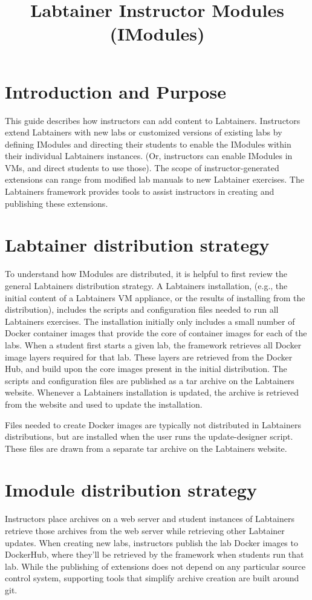 \documentclass[12pt]{article}
\begin{document}
\title {Labtainer Instructor Modules (IModules)}
\maketitle

\section{Introduction and Purpose}
This guide describes how instructors can add content to Labtainers.
Instructors extend Labtainers with new labs or customized versions of existing
labs by defining IModules and directing their students to enable the IModules within
their individual Labtainers instances. 
(Or, instructors can enable IModules in VMs, and direct students to use those).
The scope of instructor-generated extensions can range from modified lab manuals 
to new Labtainer exercises.  The Labtainers framework provides tools
to assist instructors in creating and publishing these extensions. 

\section{Labtainer distribution strategy}
To understand how IModules are distributed, it is helpful to first review the general
Labtainers distribution strategy.  A Labtainers installation, (e.g., the initial content of a Labtainers VM 
appliance, or the results of installing from the distribution),  includes the scripts and configuration files 
needed to run all Labtainers exercises.  The installation initially only includes a small number of 
Docker container images that provide the core of container images for each of the labs.   
When a student first starts a given lab, the framework retrieves all Docker image layers 
required for that lab.  These layers are retrieved from the Docker Hub, and build upon the core images
present in the initial distribution.   The scripts and configuration files are 
published as a tar archive on the Labtainers website.  Whenever a Labtainers installation is updated, 
the archive is retrieved from the website and used to update the installation.

Files needed to create Docker images are typically not distributed in Labtainers distributions, but are 
installed when the user runs the update-designer script.  These files are drawn from a separate 
tar archive on the Labtainers website.  

\section{Imodule distribution strategy}
Instructors place archives on a web server and student
instances of Labtainers retrieve those archives from the web server while retrieving other
Labtainer updates.  When creating new labs, instructors publish the lab Docker images to
DockerHub, where they'll be retrieved by the framework when students run that lab.
While the publishing of extensions does not depend on any particular 
source control system, supporting tools that simplify archive creation are built around git.  
\end{document}
